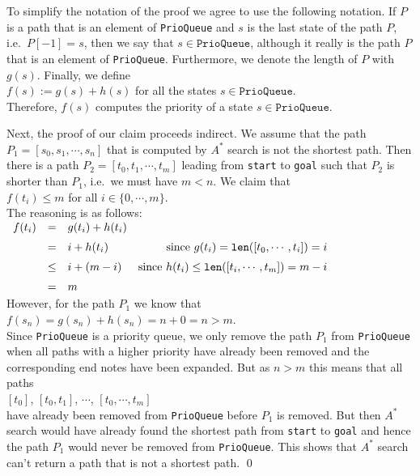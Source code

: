 \proof
To simplify the notation of the proof we agree to use the following notation.
If $P$ is a path that is an element of \texttt{PrioQueue} and $s$ is the last state of the path $P$,
i.e.~$P[-1] = s$,  then we say that $s \in \mathtt{PrioQueue}$, although it really is the path $P$ that is an
element of \texttt{PrioQueue}.  Furthermore, we denote the length of $P$ with $g(s)$. Finally, we define
\\[0.2cm]
\hspace*{1.3cm}
$f(s) := g(s) + h(s)$  \quad for all the states $s \in \mathtt{PrioQueue}$. 
\\[0.2cm]
Therefore, $f(s)$ computes the priority of a state $s \in \mathtt{PrioQueue}$.

Next, the proof of our claim proceeds indirect.  We assume that the path $P_1 = [s_0, s_1, \cdots, s_n]$ that
is computed by $A^*$ search is not the shortest path.  Then there is a path $P_2 = [t_0, t_1, \cdots, t_m]$
leading from \texttt{start} to \texttt{goal} such that $P_2$ is shorter than $P_1$, i.e.~we must have $m < n$. 
We claim that 
\\[0.2cm]
\hspace*{1.3cm}
$f(t_i) \leq m$  \quad for all $i \in \{0, \cdots, m\}$.
\\[0.2cm]
The reasoning is as follows:
\\[0.2cm]
\hspace*{1.3cm}
$
\begin{array}[t]{lclr}
  f(t_i) & = & g(t_i) + h(t_i)  \\[0.2cm] 
         & = & i + h(t_i)     & \mbox{since $g(t_i) = \texttt{len}([t_0, \cdots, t_i]) = i$}  \\[0.2cm]
         & \leq & i + (m - i) & \mbox{since $h(t_i) \leq \texttt{len}([t_i, \cdots, t_m]) = m-i$} \\[0.2cm]
         & = & m                       
\end{array}
$
\\[0.2cm]
However, for the path $P_1$ we know that
\\[0.2cm]
\hspace*{1.3cm}
$f(s_n) = g(s_n) + h(s_n) = n + 0 = n > m$.
\\[0.2cm]
Since \texttt{PrioQueue} is a priority queue, we only remove the path $P_1$ from \texttt{PrioQueue} when all
paths with a higher priority have already been removed and the corresponding end notes have been
expanded.  But as $n > m$ this means that all paths
\\[0.2cm]
\hspace*{1.3cm}
$[t_0]$, $[t_0,t_1]$, $\cdots$, $[t_0, \cdots, t_m]$ 
\\[0.2cm]
have already been removed from \texttt{PrioQueue} before $P_1$ is removed.  But then $A^*$ search would have
already found the shortest path from \texttt{start} to \texttt{goal} and hence the path $P_1$ would never be
removed from \texttt{PrioQueue}.   This shows that $A^*$ search can't return a path that is not a shortest path.
\qed


